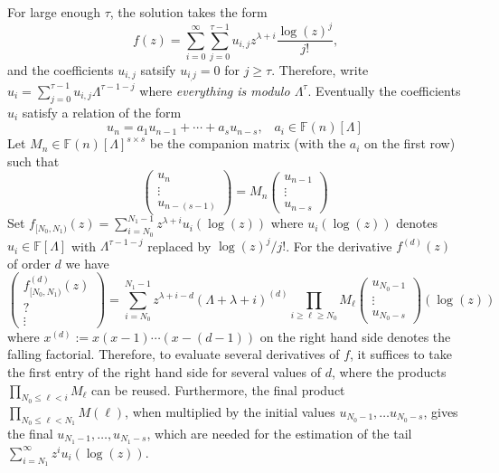 \documentclass[12pt]{article}
\numberwithin{equation}{section}
\begin{document}
For large enough $\tau$, the solution takes the form
\begin{equation*}
f(z) = \sum_{i=0}^{\infty} \sum_{j=0}^{\tau-1} u_{i,j} z^{\lambda+i} \frac{\log(z)^j}{j!}\text{,}
\end{equation*}
and the coefficients $u_{i,j}$ satsify $u_{i_,j} = 0$ for $j \ge \tau$. Therefore, write $u_i = \sum_{j=0}^{\tau-1} u_{i,j} \Lambda^{\tau-1-j}$ where \emph{everything is modulo $\Lambda^\tau$}.
Eventually the coefficients $u_{i}$ satisfy a relation of the form
\begin{equation}
\label{unrec}
u_n = a_1 u_{n-1} + \cdots + a_s u_{n-s}\text{,} \quad a_i \in \mathbb{F}(n)[\Lambda]
\end{equation}
Let $M_n \in \mathbb{F}(n)[\Lambda] ^{s \times s}$ be the companion matrix (with the $a_i$ on the first row) such that
\begin{equation*}
\left(\begin{array}{c}
u_n\\
\vdots \\
u_{n-(s-1)}
\end{array}\right)
=M_n
\left(\begin{array}{c}
u_{n-1}\\
\vdots \\
u_{n-s}
\end{array}\right)
\end{equation*}
Set $f_{[N_0,N_1)}(z) = \sum_{i=N_0}^{N_1-1} z^{\lambda+i} u_i(\log(z))$ where $u_i(\log(z))$ denotes $u_i \in \mathbb{F}[\Lambda]$ with $\Lambda^{\tau-1-j}$ replaced by $\log(z)^j/j!$.
For the derivative $f^{(d)}(z)$ of order $d$ we have
\begin{equation*}
\left(\begin{array}{c}
f_{[N_0,N_1)}^{(d)}(z) \\
? \\
\vdots
\end{array}\right) = \sum_{i=N_0}^{N_1-1} z^{\lambda+i-d} (\Lambda+\lambda+i)^{(d)}\prod_{i\ge \ell \ge N_0}M_{\ell}
\left(\begin{array}{c}
u_{N_0-1}\\
\vdots \\
u_{N_0-s}
\end{array}\right) (\log(z))\end{equation*}
where $x^{(d)} := x(x-1)\cdots(x-(d-1))$ on the right hand side denotes the falling factorial. Therefore, to evaluate several derivatives of $f$, it suffices to take the first entry of the right hand side for several values of $d$, where the products $\prod_{N_0\le \ell < i}M_{\ell}$ can be reused. Furthermore, the final product $\prod_{N_0\le \ell < N_1}M(\ell)$, when multiplied by the initial values $u_{N_0-1}, \dots u_{N_0-s}$, gives the final $u_{N_1-1}, \dots, u_{N_1-s}$, which are needed for the estimation of the tail $\sum_{i=N_1}^{\infty} z^i u_i(\log(z))$.
\end{document}
